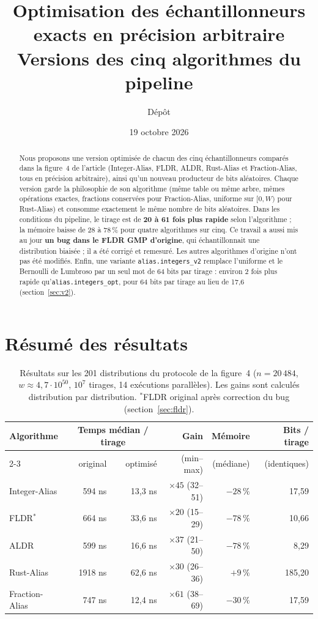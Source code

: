 \documentclass[11pt,a4paper]{article}
\title{Optimisation des échantillonneurs exacts en précision arbitraire\\[2pt]
\large Versions \code{\_opt} des cinq algorithmes du pipeline}
\author{Dépôt \code{FLDR-experiments}}
\date{19 octobre 2026}
\newcommand{\code}[1]{\texttt{#1}}
\begin{document}
\sloppy
\maketitle

\begin{abstract}
Nous proposons une version optimisée de chacun des cinq échantillonneurs comparés
dans la figure~4 de l'article (Integer-Alias, FLDR, ALDR, Rust-Alias et
Fraction-Alias, tous en précision arbitraire), ainsi qu'un nouveau producteur de
bits aléatoires. Chaque version garde la philosophie de son algorithme (même table
ou même arbre, mêmes opérations exactes, fractions conservées pour Fraction-Alias,
uniforme sur $[0, W)$ pour Rust-Alias) et consomme exactement le même nombre de bits
aléatoires. Dans les conditions du pipeline, le tirage est de \textbf{20 à 61 fois
plus rapide} selon l'algorithme ; la mémoire baisse de 28 à 78\,\% pour quatre
algorithmes sur cinq. Ce travail a aussi mis au jour \textbf{un bug dans le FLDR GMP
d'origine}, qui échantillonnait une distribution biaisée ; il a été corrigé et
remesuré. Les autres algorithmes d'origine n'ont pas été modifiés. Enfin, une variante
\code{alias.integers\_v2} remplace l'uniforme et le Bernoulli de Lumbroso par un seul
mot de 64 bits par tirage : environ 2 fois plus rapide qu'\code{alias.integers\_opt},
pour 64 bits par tirage au lieu de 17,6 (section~\ref{sec:v2}).
\end{abstract}

\section{Résumé des résultats}

\begin{table}[H]
\centering
\small
\begin{tabular}{lrrrrr}
\toprule
Algorithme & \multicolumn{2}{c}{Temps médian / tirage} & Gain & Mémoire & Bits / tirage \\
\cmidrule(lr){2-3}
 & original & optimisé & (min--max) & (médiane) & (identiques) \\
\midrule
Integer-Alias  & 594 ns  & 13,3 ns & $\times 45$ (32--51) & $-28\,\%$ & 17,59 \\
FLDR$^*$       & 664 ns  & 33,6 ns & $\times 20$ (15--29) & $-78\,\%$ & 10,66 \\
ALDR           & 599 ns  & 16,6 ns & $\times 37$ (21--50) & $-78\,\%$ & 8,29 \\
Rust-Alias     & 1918 ns & 62,6 ns & $\times 30$ (26--36) & $+9\,\%$  & 185,20 \\
Fraction-Alias & 747 ns  & 12,4 ns & $\times 61$ (38--69) & $-30\,\%$ & 17,59 \\
\bottomrule
\end{tabular}
\caption{Résultats sur les 201 distributions du protocole de la figure~4
($n = 20\,484$, $w \approx 4{,}7\cdot 10^{50}$, $10^7$ tirages, 14 exécutions
parallèles). Les gains sont calculés distribution par distribution.
$^*$FLDR original après correction du bug (section~\ref{sec:fldr}).}
\label{tab:resume}
\end{table}
\end{document}
